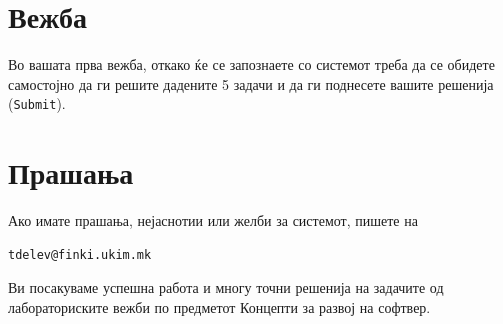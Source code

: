 \section{Вежба}

Во вашата прва вежба, откако ќе се запознаете со системот треба да се обидете
самостојно да ги решите дадените 5 задачи и да ги поднесете вашите решенија
(\texttt{Submit}).

\section{Прашања}

Ако имате прашања, нејаснотии или желби за системот, пишете на
\begin{verbatim}
tdelev@finki.ukim.mk
\end{verbatim}

Ви посакуваме успешна работа и многу точни решенија на задачите од
лабораториските вежби по предметот Концепти за развој на софтвер.


